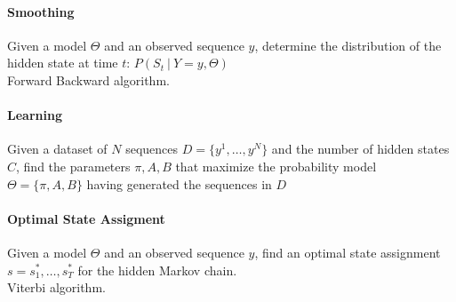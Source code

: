 \documentclass[10pt]{report}
\begin{document}
\paragraph{Smoothing} Given a model $\Theta$ and an observed sequence $y$, determine the distribution of the hidden state at time $t$: $P(S_t\:|\:Y=y,\Theta)$\\
Forward Backward algorithm.
\paragraph{Learning} Given a dataset of $N$ sequences $D=\{y^1,\ldots,y^N\}$ and the number of hidden states $C$, find the parameters $\pi,A,B$ that maximize the probability model $\Theta = \{\pi,A,B\}$ having generated the sequences in $D$
\paragraph{Optimal State Assigment} Given a model $\Theta$ and an observed sequence $y$, find an optimal state assignment $s = s_1^*,\ldots,s_T^*$ for the hidden Markov chain.\\
Viterbi algorithm.
\end{document}
